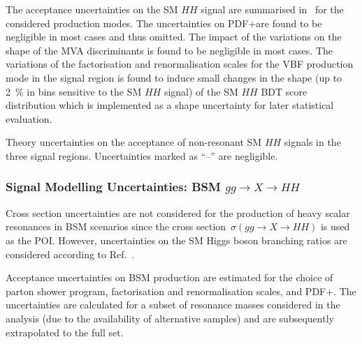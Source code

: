 The acceptance uncertainties on the SM $HH$ signal are summarised
in~ for the considered production
modes. The uncertainties on PDF+\alphas are found to be negligible in
most cases and thus omitted. The impact of the variations on the shape
of the MVA discriminants is found to be negligible in most cases. The
variations of the factorisation and renormalisation scales for the VBF
production mode in the \hadhad signal region is found to induce small
changes in the shape (up to \SI{2}{\percent} in bins sensitive to the
SM $HH$ signal) of the SM $HH$ BDT score distribution which is
implemented as a shape uncertainty for later statistical evaluation.

\begin{table}[htbp]
  \centering

  \caption{Theory uncertainties on the acceptance of non-resonant SM
    $HH$ signals in the three signal regions. Uncertainties marked as
    ``--'' are negligible.}%
  \label{tab:theory_uncertainty_signal}

  
\end{table}


\subsubsection{Signal Modelling Uncertainties: BSM $gg \to X \to HH$}

Cross section uncertainties are not considered for the production of
heavy scalar resonances in BSM scenarios since the cross
section~$\sigma(gg \to X \to HH)$ is used as the POI. However,
uncertainties on the SM Higgs boson branching ratios are considered
according to Ref.~\cite{deFlorian:2016spz}.

Acceptance uncertainties on BSM \HH production are estimated for the
choice of parton shower program, factorisation and renormalisation
scales, and PDF+\alphas. The uncertainties are calculated for a subset
of resonance masses considered in the analysis (due to the
availability of alternative samples) and are subsequently extrapolated
to the full set.

